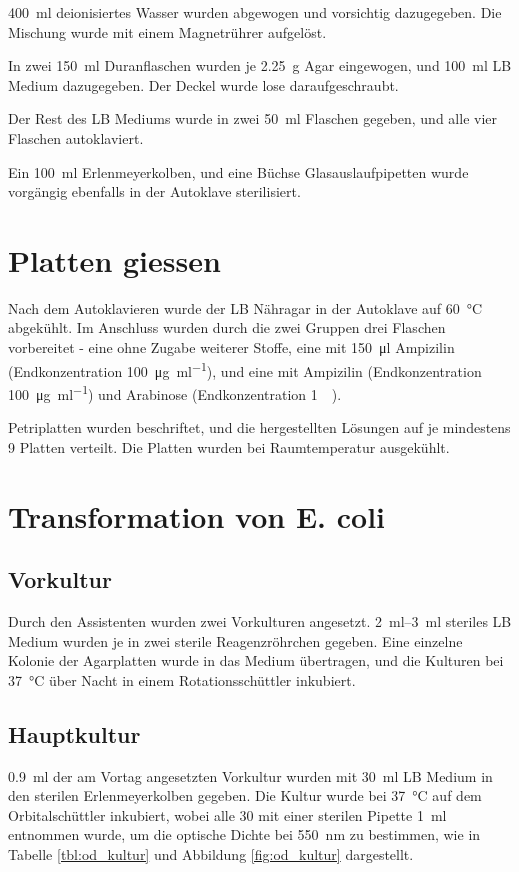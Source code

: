 \documentclass[a4paper,english]{scrreprt}
\begin{document}
\SI{400}{\ml} deionisiertes Wasser wurden abgewogen und vorsichtig dazugegeben.
Die Mischung wurde mit einem Magnetrührer aufgelöst.

In zwei \SI{150}{\ml} Duranflaschen wurden je \SI{2.25}{\g} Agar eingewogen,
und \SI{100}{\ml} LB Medium dazugegeben. Der Deckel wurde lose
daraufgeschraubt.

Der Rest des LB Mediums wurde in zwei \SI{50}{\ml} Flaschen gegeben, und alle
vier Flaschen autoklaviert.

Ein \SI{100}{\ml} Erlenmeyerkolben, und eine Büchse Glasauslaufpipetten wurde
vorgängig ebenfalls in der Autoklave sterilisiert.

\section{Platten giessen}

Nach dem Autoklavieren wurde der LB Nähragar in der Autoklave auf
\SI{60}{\celsius} abgekühlt. Im Anschluss wurden durch die zwei Gruppen drei
Flaschen vorbereitet - eine ohne Zugabe weiterer Stoffe, eine mit \SI{150}{\ul}
Ampizilin (Endkonzentration \SI{100}{\ug \per \ml}), und eine mit Ampizilin
(Endkonzentration \SI{100}{\ug \per \ml}) und Arabinose (Endkonzentration
\SI{1}{\milli\Molar}).

Petriplatten wurden beschriftet, und die hergestellten Lösungen auf je
mindestens 9 Platten verteilt. Die Platten wurden bei Raumtemperatur
ausgekühlt.

\section{Transformation von E. coli}

\subsection{Vorkultur}

Durch den Assistenten wurden zwei Vorkulturen angesetzt. \SIrange{2}{3}{\ml}
steriles LB Medium wurden je in zwei sterile Reagenzröhrchen gegeben. Eine
einzelne Kolonie der Agarplatten wurde in das Medium übertragen, und die
Kulturen bei \SI{37}{\celsius} über Nacht in einem Rotationsschüttler
inkubiert.

\subsection{Hauptkultur}

\SI{0.9}{\ml} der am Vortag angesetzten Vorkultur wurden mit \SI{30}{\ml} LB
Medium in den sterilen Erlenmeyerkolben gegeben. Die Kultur wurde bei
\SI{37}{\celsius} auf dem Orbitalschüttler inkubiert, wobei alle \SI{30}{\min}
mit einer sterilen Pipette \SI{1}{\ml} entnommen wurde, um die optische Dichte
bei \SI{550}{\nm} zu bestimmen, wie in Tabelle \ref{tbl:od_kultur} und
Abbildung \ref{fig:od_kultur} dargestellt.
\end{document}
